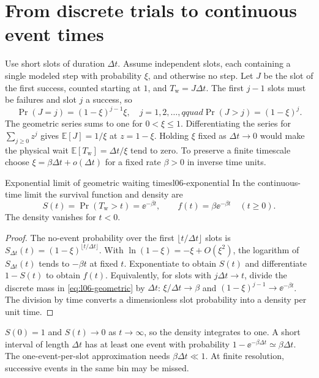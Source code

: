 \section{From discrete trials to continuous event times}
\label{sec:l06-poisson}

Use short slots of duration $\Delta t$. Assume independent slots, each containing a single modeled step with probability $\xi$, and otherwise no step. Let $J$ be the slot of the first success, counted starting at $1$, and $T_{\mathrm{w}}=J\Delta t$. The first $j-1$ slots must be failures and slot $j$ a success, so
\begin{equation}
 \Pr(J=j)=(1-\xi)^{j-1}\xi,\quad j=1,2,\ldots,qquad
 \Pr(J>j)=(1-\xi)^j.
 \label{eq:l06-geometric}
\end{equation}
The geometric series sums to one for $0<\xi\le1$. Differentiating the series for $\sum_{j\ge0}z^j$ gives $\mathbb E[J]=1/\xi$ at $z=1-\xi$. Holding $\xi$ fixed as $\Delta t\to0$ would make the physical wait $\mathbb E[T_{\mathrm{w}}]=\Delta t/\xi$ tend to zero. To preserve a finite timescale choose $\xi=\beta\Delta t+o(\Delta t)$ for a fixed rate $\beta>0$ in inverse time units.

\begin{proposition}{Exponential limit of geometric waiting times}{l06-exponential}
In the continuous-time limit the survival function and density are
\begin{equation}
 \boxed{S(t)=\Pr(T_{\mathrm{w}}>t)=\ee^{-\beta t},\qquad
        f(t)=\beta\ee^{-\beta t}\quad (t\ge0).}
 \label{eq:l06-exp-wait}
\end{equation}
The density vanishes for $t<0$.
\end{proposition}

\begin{proof}
The no-event probability over the first $\lfloor t/\Delta t\rfloor$ slots is
$S_{\Delta t}(t)=(1-\xi)^{\lfloor t/\Delta t\rfloor}$. With
$\ln(1-\xi)=-\xi+O(\xi^2)$, the logarithm of $S_{\Delta t}(t)$ tends to $-\beta t$ at fixed $t$. Exponentiate to obtain $S(t)$ and differentiate $1-S(t)$ to obtain $f(t)$. Equivalently, for slots with $j\Delta t\to t$, divide the discrete mass in \eqref{eq:l06-geometric} by $\Delta t$: $\xi/\Delta t\to\beta$ and $(1-\xi)^{j-1}\to\ee^{-\beta t}$. The division by time converts a dimensionless slot probability into a density per unit time.
\end{proof}

$S(0)=1$ and $S(t)\to0$ as $t\to\infty$, so the density integrates to one. A short interval of length $\Delta t$ has at least one event with probability $1-\ee^{-\beta\Delta t}\simeq\beta\Delta t$. The one-event-per-slot approximation needs $\beta\Delta t\ll1$. At finite resolution, successive events in the same bin may be missed.

